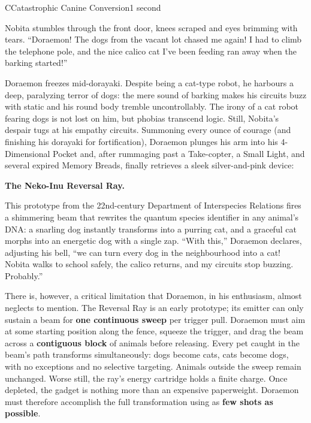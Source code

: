 \begin{problem}{C}{Catastrophic Canine Conversion}{1 second}

\noindent
Nobita stumbles through the front door, knees scraped and eyes brimming with tears.
``Doraemon! The dogs from the vacant lot chased me again! I had to climb the telephone pole, and the nice calico cat I've been feeding ran away when the barking started!''

\noindent
Doraemon freezes mid-dorayaki. Despite being a cat-type robot, he harbours a deep, paralyzing terror of dogs: the mere sound of barking makes his circuits buzz with static and his round body tremble uncontrollably.
The irony of a cat robot fearing dogs is not lost on him, but phobias transcend logic.
Still, Nobita's despair tugs at his empathy circuits. Summoning every ounce of courage (and finishing his dorayaki for fortification), Doraemon plunges his arm into his 4-Dimensional Pocket and, after rummaging past a Take-copter, a Small Light, and several expired Memory Breads, finally retrieves a sleek silver-and-pink device:

\noindent
\textbf{The Neko-Inu Reversal Ray.}

\noindent
This prototype from the 22nd-century Department of Interspecies Relations fires a shimmering beam that rewrites the quantum species identifier in any animal's DNA: a snarling dog instantly transforms into a purring cat, and a graceful cat morphs into an energetic dog with a single zap.
``With this,'' Doraemon declares, adjusting his bell, ``we can turn every dog in the neighbourhood into a cat! Nobita walks to school safely, the calico returns, and my circuits stop buzzing. Probably.''

\noindent
There is, however, a critical limitation that Doraemon, in his enthusiasm, almost neglects to mention.
The Reversal Ray is an early prototype; its emitter can only sustain a beam for \textbf{one continuous sweep} per trigger pull.
Doraemon must aim at some starting position along the fence, squeeze the trigger, and drag the beam across a \textbf{contiguous block} of animals before releasing.
Every pet caught in the beam's path transforms simultaneously: dogs become cats, cats become dogs, with no exceptions and no selective targeting.
Animals outside the sweep remain unchanged.
Worse still, the ray's energy cartridge holds a finite charge.
Once depleted, the gadget is nothing more than an expensive paperweight.
Doraemon must therefore accomplish the full transformation using as \textbf{few shots as possible}.


\end{problem}
